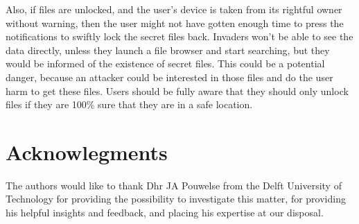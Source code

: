 \documentclass[twocolumn,english,compsoc,journal]{IEEEtran}
\begin{document}
Also, if files are unlocked, and the user's device is taken from
its rightful owner without warning, then the user might not have
gotten enough time to press the notifications to swiftly lock
the secret files back. Invaders won't be able to see the data
directly, unless they launch a file browser and start searching,
but they would be informed of the existence of secret files.
This could be a potential danger, because an attacker could be
interested in those files and do the user harm to get these
files. Users should be fully aware that they should only unlock
files if they are 100\% sure that they are in a safe location.

\section*{Acknowlegments}

The authors would like to thank Dhr JA Pouwelse from the Delft University of Technology for providing the possibility to investigate this matter, for providing his helpful insights and feedback, and placing his expertise at our disposal.



\end{document}
